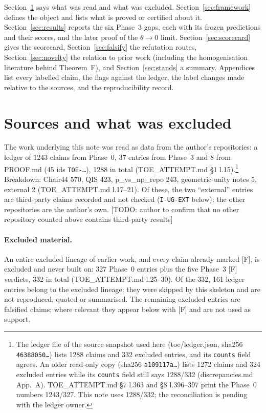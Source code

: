 \documentclass[11pt]{article}
\newcommand\todo[1]{{\color{red}\sffamily\small[TODO: #1]}}
\begin{document}
Section~\ref{sec:sources} says what was read and what was excluded. Section~\ref{sec:framework} defines the object and lists what is proved or certified about it. Section~\ref{sec:results} reports the six Phase~3 gaps, each with its frozen predictions and their scores, and the later proof of the $\theta\to0$ limit. Section~\ref{sec:scorecard} gives the scorecard, Section~\ref{sec:falsify} the refutation routes, Section~\ref{sec:novelty} the relation to prior work (including the homogenisation literature behind Theorem~F), and Section~\ref{sec:stands} a summary. Appendices list every labelled claim, the flags against the ledger, the label changes made relative to the sources, and the reproducibility record.

\section{Sources and what was excluded}\label{sec:sources}
The work underlying this note was read as data from the author's repositories: a ledger of 1243 claims from Phase~0, 37 entries from Phase~3 and 8 from PROOF.md (45 ids \texttt{TOE-\dots}), 1288 in total (TOE\_ATTEMPT.md \S1 l.15).\footnote{The ledger file of the source snapshot used here (toe/ledger.json, sha256 \texttt{46388050\ldots}) lists 1288 claims and 332 excluded entries, and its \texttt{counts} field agrees. An older read-only copy (sha256 \texttt{a109117a\ldots}) lists 1272 claims and 324 excluded entries while its \texttt{counts} field still says 1288/332 (discrepancies.md App.~A). TOE\_ATTEMPT.md \S7 l.363 and \S8 l.396--397 print the Phase~0 numbers 1243/327. This note uses 1288/332; the reconciliation is pending with the ledger owner.}
Breakdown: Chair44 570, QIS 423, p\_vs\_np\_repo 243, geometric-unity notes 5, external 2 (TOE\_ATTEMPT.md l.17--21). Of these, the two ``external'' entries are third-party claims recorded and not checked (\texttt{I-UG-EXT} below); the other repositories are the author's own. \todo{author to confirm that no other repository counted above contains third-party results}

\paragraph{Excluded material.} An entire excluded lineage of earlier work, and every claim already marked [F], is excluded and never built on: 327 Phase~0 entries plus the five Phase~3 [F] verdicts, 332 in total (TOE\_ATTEMPT.md l.25--30). Of the 332, 161 ledger entries belong to the excluded lineage; they were skipped by this skeleton and are not reproduced, quoted or summarised. The remaining excluded entries are falsified claims; where relevant they appear below with [F] and are not used as support.
\end{document}
